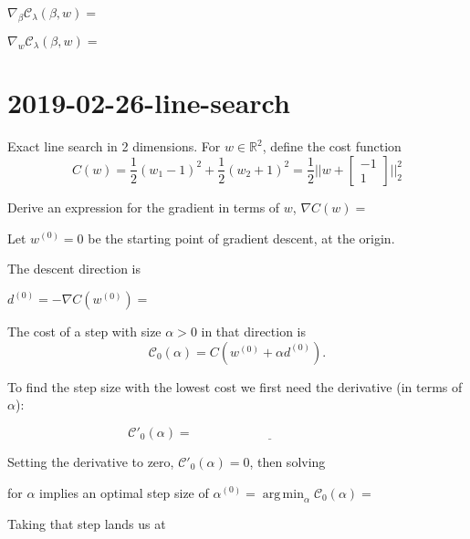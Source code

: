 \documentclass{article}
\DeclareMathOperator*{\argmin}{arg\,min}
\begin{document}
\vskip 1in

$\nabla_\beta \mathcal C_\lambda(\beta, w)= $\underline{\hspace{2in}}

\vskip 1in

$\nabla_w \mathcal C_\lambda(\beta, w)= $\underline{\hspace{2in}}

\newpage
\section{2019-02-26-line-search}
Exact line search in 2 dimensions. For $w\in\mathbb R^2$, define the
cost function
$$C(w) = \frac 1 2 (w_1-1)^2 + \frac 1 2 (w_2+1)^2 = \frac 1 2 ||w +
\left[\begin{array}{c}
  -1\\
   1
\end{array}\right]
||^2_2$$

\vskip 1cm
Derive an expression for the gradient in terms of $w$, $\nabla C(w)=$\underline{\hspace{2in}}

Let $w^{(0)}=0$ be the starting point of gradient descent, at the
origin. 

\vskip 1cm
The descent direction is

$d^{(0)} = -\nabla C(w^{(0)})=$\underline{\hspace{2in}}

The cost of a step with size $\alpha>0$ in that direction is
\begin{equation*}
  \mathcal C_0(\alpha) = C(w^{(0)} + \alpha d^{(0)}).
\end{equation*}

To find the step size with the lowest cost we first need the derivative
(in terms of $\alpha$):

\vskip 1cm
\begin{equation*}
  \mathcal C'_0(\alpha) = \underline{\hspace{2in}}
\end{equation*}

\vskip 1cm 

Setting the derivative to zero, $\mathcal C'_0(\alpha)=0$,
then solving 

for $\alpha$
implies an optimal step size of
$\alpha^{(0)}=\argmin_\alpha \mathcal
C_0(\alpha)=$\underline{\hspace{2in}}

\vskip 1cm
Taking that step lands us at 
\end{document}
